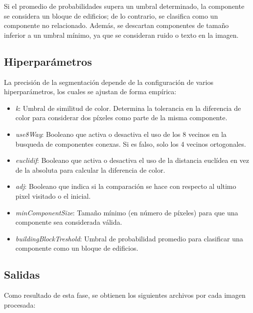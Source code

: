\documentclass[twocolumn, fontsize=10pt]{article}
\begin{document}
Si el promedio de probabilidades supera un umbral determinado, la componente se considera un bloque de edificios; de lo contrario, se clasifica como un componente no relacionado. Además, se descartan componentes de tamaño inferior a un umbral mínimo, ya que se consideran ruido o texto en la imagen.

\subsection{Hiperparámetros}
La precisión de la segmentación depende de la configuración de varios hiperparámetros, los cuales se ajustan de forma empírica:



\begin{itemize}
    \item \textit{k}: Umbral de similitud de color. Determina la tolerancia en la diferencia de color para considerar dos píxeles como parte de la misma componente.
    \item \textit{use8Way}: Booleano que activa o desactiva el uso de los 8 vecinos en la busqueda de componentes conexas. Si es falso, solo los 4 vecinos ortogonales.
    \item \textit{euclidif}: Booleano que activa o desactiva el uso de la distancia euclídea en vez de la absoluta para calcular la diferencia de color.
    \item \textit{adj}: Booleano que indica si la comparación se hace con respecto al ultimo pixel visitado o el inicial.
    \item \textit{minComponentSize}: Tamaño mínimo (en número de píxeles) para que una componente sea considerada válida.
    \item \textit{buildingBlockTreshold}: Umbral de probabilidad promedio para clasificar una componente como un bloque de edificios.
\end{itemize}

\subsection{Salidas}
Como resultado de esta fase, se obtienen los siguientes archivos por cada imagen procesada:
\end{document}
